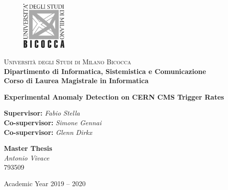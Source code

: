 
\thispagestyle{empty}
\addtocounter{page}{-1}

	\begin{figure}
		\vspace*{-8mm}
		\centering
		\includegraphics[width=0.20\textwidth]{logo-bicocca.jpg}
	\end{figure}
	\large \noindent \textsc{Università degli Studi di Milano Bicocca} \\
	\textbf{Dipartimento di Informatica, Sistemistica e Comunicazione \\
			Corso di Laurea Magistrale in Informatica}

\vfill


\begin{center}
	{\Huge \textbf{Experimental Anomaly Detection on CERN CMS Trigger Rates}}
\end{center}

\vfill

\begin{flushleft}
	{\Large \textbf{Supervisor:} \textit{Fabio Stella} \\
	 \textbf{Co-supervisor:} \textit{Simone Gennai} \\
	 \textbf{Co-supervisor:} \textit{Glenn Dirkx}}
\end{flushleft}

\vspace{8mm}
\par

\begin{flushright}
	{\Large \textbf{Master Thesis} \\
			\textit{Antonio Vivace} \\ 793509}
\end{flushright}

\vfill
\par

\begin{center}
	{\large Academic Year 2019 -- 2020}
\end{center}

\clearpage